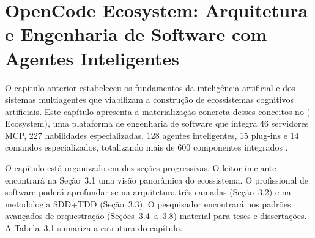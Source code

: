 \chapter{OpenCode Ecosystem: Arquitetura e Engenharia de Software com Agentes Inteligentes}
\label{cap:opencode-arquitetura}

O capítulo anterior estabeleceu os fundamentos da inteligência artificial e
dos sistemas multiagentes que viabilizam a construção de ecossistemas
cognitivos artificiais. Este capítulo apresenta a materialização concreta
desses conceitos no \opencodeeco{} (\opencode{} Ecosystem), uma plataforma
de engenharia de software que integra 46 servidores MCP, 227 habilidades
especializadas, 128 agentes inteligentes, 15 plug-ins e 14 comandos
especializados, totalizando mais de 600 componentes integrados
\cite{opencode2026ecosystem}.

O capítulo está organizado em dez seções progressivas. O leitor iniciante
encontrará na Seção~3.1 uma visão panorâmica do ecossistema. O profissional
de software poderá aprofundar-se na arquitetura três camadas (Seção~3.2) e
na metodologia SDD+TDD (Seção~3.3). O pesquisador encontrará nos padrões
avançados de orquestração (Seções~3.4~a~3.8) material para teses e
dissertações. A Tabela~3.1 sumariza a estrutura do capítulo.

\begin{table}[htb]
\centering
    \small
\caption{Estrutura do Capítulo 3}
\label{tab:estrutura-capitulo3}
\end{table}

